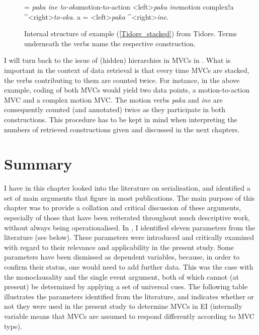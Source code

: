 \begin{figure}[h]
\jtree[xunit=8em]
\! = {\textit{paka ine to-oka}}{motion-to-action}
<left>{\textit{paka ine}}{motion complex}!a ^<right>{\textit{to-oka}}.
\!a = <left>{\textit{paka}} ^<right>{\textit{ine}}.
\endjtree


\caption[Internal structure of example (\ref{Tidore_stacked}) from Tidore]{Internal structure of example (\ref{Tidore_stacked}) from Tidore. Terms underneath the verbs name the respective construction.}
\label{figure:tidoreMVC}
\end{figure}

I will turn back to the issue of (hidden) hierarchies in MVCs in . What is important in the context of data retrieval is that every time MVCs are stacked, the verbs contributing to them are counted twice. For instance, in the above example, coding of both MVCs would yield two data points, a motion-to-action MVC and a complex motion MVC. The motion verbs \textit{paka} and \textit{ine} are consequently counted (and annotated) twice as they participate in both constructions. This procedure has to be kept in mind when interpreting the numbers of retrieved constructions given and discussed in the next chapters.

\section{Summary}

I have in this chapter looked into the literature on serialisation, and identified a set of main arguments that figure in most publications. The main purpose of this chapter was to provide a collation and critical discussion of these arguments, especially of those that have been reiterated throughout much descriptive work, without always being operationalised. In , I identified eleven parameters from the literature (see below). These parameters were introduced and critically examined with regard to their relevance and applicability in the present study. Some parameters have been dismissed as dependent variables, because, in order to confirm their status, one would need to add further data. This was the case with the monoclausality and the single event argument, both of which cannot (at present) be determined by applying a set of universal cues. The following table illustrates the parameters identified from the literature, and indicates whether or not they were used in the present study to determine MVCs in EI (internally variable means that MVCs are assumed to respond differently according to MVC type).

